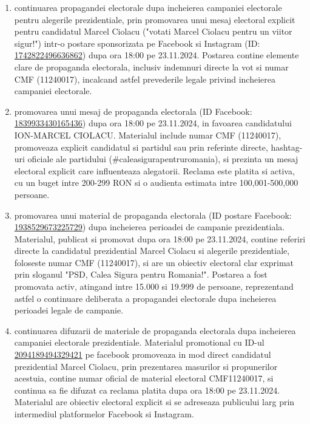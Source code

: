 \documentclass[a4paper,12pt]{article}
\begin{document}
\begin{enumerate}[leftmargin=*, label=\arabic*.)]
    \item continuarea propagandei electorale dupa incheierea campaniei electorale pentru alegerile prezidentiale, prin promovarea unui mesaj electoral explicit pentru candidatul Marcel Ciolacu ("votati Marcel Ciolacu pentru un viitor sigur!") intr-o postare sponsorizata pe Facebook si Instagram (ID: \href{https://www.facebook.com/ads/library/?id=1742822496636862}{1742822496636862}) dupa ora 18:00 pe 23.11.2024. Postarea contine elemente clare de propaganda electorala, inclusiv indemnuri directe la vot si numar CMF (11240017), incalcand astfel prevederile legale privind incheierea campaniei electorale.
    \item promovarea unui mesaj de propaganda electorala (ID Facebook: \href{https://www.facebook.com/ads/library/?id=1839933430165436}{1839933430165436}) dupa ora 18:00 pe 23.11.2024, in favoarea candidatului ION-MARCEL CIOLACU. Materialul include numar CMF (11240017), promoveaza explicit candidatul si partidul sau prin referinte directe, hashtag-uri oficiale ale partidului (\#caleasigurapentruromania), si prezinta un mesaj electoral explicit care influenteaza alegatorii. Reclama este platita si activa, cu un buget intre 200-299 RON si o audienta estimata intre 100,001-500,000 persoane.
    \item promovarea unui material de propaganda electorala (ID postare Facebook: \href{https://www.facebook.com/ads/library/?id=1938529673225729}{1938529673225729}) dupa incheierea perioadei de campanie prezidentiala. Materialul, publicat si promovat dupa ora 18:00 pe 23.11.2024, contine referiri directe la candidatul prezidential Marcel Ciolacu si alegerile prezidentiale, foloseste numar CMF (11240017), si are un obiectiv electoral clar exprimat prin sloganul "PSD, Calea Sigura pentru Romania!". Postarea a fost promovata activ, atingand intre 15.000 si 19.999 de persoane, reprezentand astfel o continuare deliberata a propagandei electorale dupa incheierea perioadei legale de campanie.
    \item continuarea difuzarii de materiale de propaganda electorala dupa incheierea campaniei electorale prezidentiale. Materialul promotional cu ID-ul \href{https://www.facebook.com/ads/library/?id=2094189494329421}{2094189494329421} pe facebook promoveaza in mod direct candidatul prezidential Marcel Ciolacu, prin prezentarea masurilor si propunerilor acestuia, contine numar oficial de material electoral CMF11240017, si continua sa fie difuzat ca reclama platita dupa ora 18:00 pe 23.11.2024. Materialul are obiectiv electoral explicit si se adreseaza publicului larg prin intermediul platformelor Facebook si Instagram.

\end{enumerate}
\end{document}
